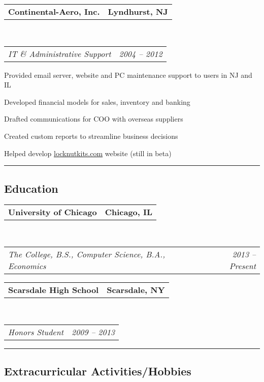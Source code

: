 \documentclass[10pt,letterpaper]{article}
\makeatletter
\newcommand{\headerrow}[2]
{\noindent \begin{tabular*}{\linewidth}{l@{\extracolsep{\fill}}r}
	#1 &
	#2 \\
\end{tabular*}}
\newcommand{\ahref}[1]
{\href{http://#1}{#1}}
\makeatother
\begin{document}
	\headerrow
		{\textbf{Continental-Aero, Inc.}}
		{\textbf{Lyndhurst, NJ}}
	\\
	\headerrow
		{\emph{IT \& Administrative Support}}
		{\emph{2004 -- 2012}}
	\begin{itemize*}
		\item Provided email server, website and PC maintenance support to users in NJ and IL
		\item Developed financial models for sales, inventory and banking
		\item Drafted communications for COO with overseas suppliers
		\item Created custom reports to streamline business decisions
		\item Helped develop \ahref{locknutkits.com} website (still in beta)
	\end{itemize*}


\vspace{0.4em}
\hrule
\vspace{-0.4em}
\subsection*{Education}

	\headerrow
		{\textbf{University of Chicago}}
		{\textbf{Chicago, IL}}
	\\
	\headerrow
		{\emph{The College, B.S., Computer Science, B.A., Economics}}
		{\emph{2013 -- Present}}

	\headerrow
		{\textbf{Scarsdale High School}}
		{\textbf{Scarsdale, NY}}
	\\
	\headerrow
		{\emph{Honors Student}}
		{\emph{2009 -- 2013}}

\vspace{0.8em}
\hrule
\vspace{-0.4em}
\subsection*{Extracurricular Activities/Hobbies}
\end{document}

